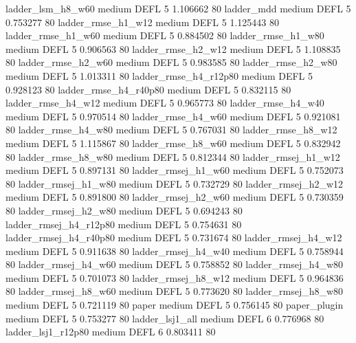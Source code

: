      ladder_lsm_h8_w60     medium     DEFL                 5 1.106662 80
            ladder_mdd     medium     DEFL                 5 0.753277 80
    ladder_rmse_h1_w12     medium     DEFL                 5 1.125443 80
    ladder_rmse_h1_w60     medium     DEFL                 5 0.884502 80
    ladder_rmse_h1_w80     medium     DEFL                 5 0.906563 80
    ladder_rmse_h2_w12     medium     DEFL                 5 1.108835 80
    ladder_rmse_h2_w60     medium     DEFL                 5 0.983585 80
    ladder_rmse_h2_w80     medium     DEFL                 5 1.013311 80
 ladder_rmse_h4_r12p80     medium     DEFL                 5 0.928123 80
 ladder_rmse_h4_r40p80     medium     DEFL                 5 0.832115 80
    ladder_rmse_h4_w12     medium     DEFL                 5 0.965773 80
    ladder_rmse_h4_w40     medium     DEFL                 5 0.970514 80
    ladder_rmse_h4_w60     medium     DEFL                 5 0.921081 80
    ladder_rmse_h4_w80     medium     DEFL                 5 0.767031 80
    ladder_rmse_h8_w12     medium     DEFL                 5 1.115867 80
    ladder_rmse_h8_w60     medium     DEFL                 5 0.832942 80
    ladder_rmse_h8_w80     medium     DEFL                 5 0.812344 80
   ladder_rmsej_h1_w12     medium     DEFL                 5 0.897131 80
   ladder_rmsej_h1_w60     medium     DEFL                 5 0.752073 80
   ladder_rmsej_h1_w80     medium     DEFL                 5 0.732729 80
   ladder_rmsej_h2_w12     medium     DEFL                 5 0.891800 80
   ladder_rmsej_h2_w60     medium     DEFL                 5 0.730359 80
   ladder_rmsej_h2_w80     medium     DEFL                 5 0.694243 80
ladder_rmsej_h4_r12p80     medium     DEFL                 5 0.754631 80
ladder_rmsej_h4_r40p80     medium     DEFL                 5 0.731674 80
   ladder_rmsej_h4_w12     medium     DEFL                 5 0.911638 80
   ladder_rmsej_h4_w40     medium     DEFL                 5 0.758944 80
   ladder_rmsej_h4_w60     medium     DEFL                 5 0.758852 80
   ladder_rmsej_h4_w80     medium     DEFL                 5 0.701073 80
   ladder_rmsej_h8_w12     medium     DEFL                 5 0.964836 80
   ladder_rmsej_h8_w60     medium     DEFL                 5 0.773620 80
   ladder_rmsej_h8_w80     medium     DEFL                 5 0.721119 80
                 paper     medium     DEFL                 5 0.756145 80
          paper_plugin     medium     DEFL                 5 0.753277 80
       ladder_lsj1_all     medium     DEFL                 6 0.776968 80
    ladder_lsj1_r12p80     medium     DEFL                 6 0.803411 80
